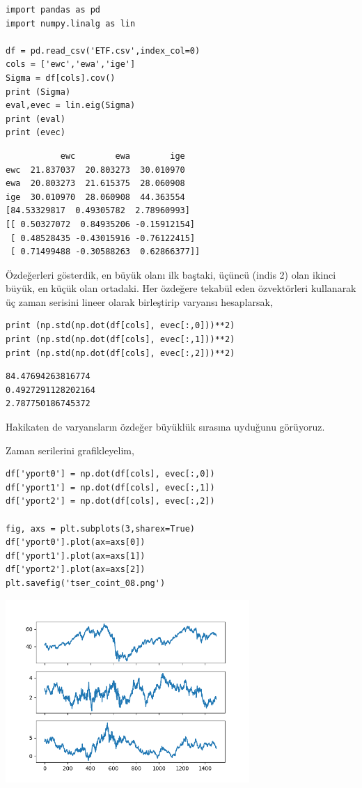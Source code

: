 \documentclass[12pt,fleqn]{article}\usepackage{../../common}
\begin{document}
\begin{verbatim}
import pandas as pd
import numpy.linalg as lin

df = pd.read_csv('ETF.csv',index_col=0)
cols = ['ewc','ewa','ige']
Sigma = df[cols].cov()
print (Sigma)
eval,evec = lin.eig(Sigma)
print (eval)
print (evec)
\end{verbatim}

\begin{verbatim}
           ewc        ewa        ige
ewc  21.837037  20.803273  30.010970
ewa  20.803273  21.615375  28.060908
ige  30.010970  28.060908  44.363554
[84.53329817  0.49305782  2.78960993]
[[ 0.50327072  0.84935206 -0.15912154]
 [ 0.48528435 -0.43015916 -0.76122415]
 [ 0.71499488 -0.30588263  0.62866377]]
\end{verbatim}

Özdeğerleri gösterdik, en büyük olanı ilk baştaki, üçüncü (indis 2) olan ikinci
büyük, en küçük olan ortadaki. Her özdeğere tekabül eden özvektörleri kullanarak
üç zaman serisini lineer olarak birleştirip varyansı hesaplarsak,

\begin{verbatim}
print (np.std(np.dot(df[cols], evec[:,0]))**2)
print (np.std(np.dot(df[cols], evec[:,1]))**2)
print (np.std(np.dot(df[cols], evec[:,2]))**2)
\end{verbatim}

\begin{verbatim}
84.47694263816774
0.4927291128202164
2.787750186745372
\end{verbatim}

Hakikaten de varyansların özdeğer büyüklük sırasına uyduğunu görüyoruz.

Zaman serilerini grafikleyelim,

\begin{verbatim}
df['yport0'] = np.dot(df[cols], evec[:,0])
df['yport1'] = np.dot(df[cols], evec[:,1])
df['yport2'] = np.dot(df[cols], evec[:,2])

fig, axs = plt.subplots(3,sharex=True)
df['yport0'].plot(ax=axs[0])
df['yport1'].plot(ax=axs[1])
df['yport2'].plot(ax=axs[2])
plt.savefig('tser_coint_08.png')
\end{verbatim}

\includegraphics[width=25em]{tser_coint_08.png}
\end{document}
